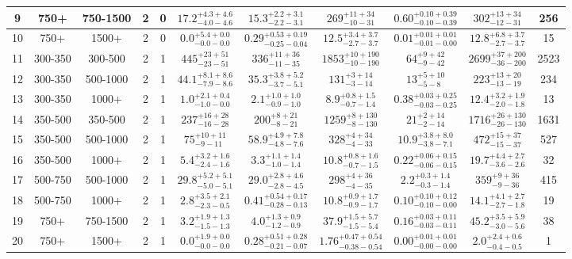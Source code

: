 \documentclass[11pt, oneside]{article}
\begin{document}
\begin{table}
{\begin{tabular}{ |c|c|c|c|c||c|c|c|c||c|c| }
9 & 750+ & 750-1500 & 2 & 0 & $17.2^{+4.3+4.6}_{-4.0-4.6}$ & $15.3^{+2.2+3.1}_{-2.2-3.1}$ & $269^{+11+34}_{-10-31}$ & $0.60^{+0.10+0.39}_{-0.10-0.39}$ & $302^{+13+34}_{-12-31}$ & 256 \\ \hline
10 & 750+ & 1500+ & 2 & 0 & $0.0^{+5.4+0.0}_{-0.0-0.0}$ & $0.29^{+0.53+0.19}_{-0.25-0.04}$ & $12.5^{+3.4+3.7}_{-2.7-3.7}$ & $0.01^{+0.01+0.01}_{-0.01-0.00}$ & $12.8^{+6.8+3.7}_{-2.7-3.7}$ & 15 \\ \hline
11 & 300-350 & 300-500 & 2 & 1 & $445^{+23+51}_{-23-51}$ & $336^{+11+36}_{-11-35}$ & $1853^{+10+190}_{-10-190}$ & $64^{+ 9+42}_{- 9-42}$ & $2699^{+37+200}_{-36-200}$ & 2523 \\ \hline
12 & 300-350 & 500-1000 & 2 & 1 & $44.1^{+8.1+8.6}_{-7.9-8.6}$ & $35.3^{+3.8+5.2}_{-3.7-5.1}$ & $131^{+ 3+14}_{- 3-14}$ & $13^{+ 5+10}_{- 5- 8}$ & $223^{+13+20}_{-13-19}$ & 234 \\ \hline
13 & 300-350 & 1000+ & 2 & 1 & $1.0^{+2.1+0.4}_{-1.0-0.0}$ & $2.1^{+1.0+1.0}_{-0.9-1.0}$ & $8.9^{+0.8+1.5}_{-0.7-1.4}$ & $0.38^{+0.03+0.25}_{-0.03-0.25}$ & $12.4^{+3.2+1.9}_{-2.0-1.8}$ & 13 \\ \hline
14 & 350-500 & 350-500 & 2 & 1 & $237^{+16+28}_{-16-28}$ & $200^{+ 8+21}_{- 8-21}$ & $1259^{+ 8+130}_{- 8-130}$ & $21^{+ 2+14}_{- 2-14}$ & $1716^{+26+130}_{-26-130}$ & 1631 \\ \hline
15 & 350-500 & 500-1000 & 2 & 1 & $75^{+10+11}_{- 9-11}$ & $58.9^{+4.9+7.8}_{-4.8-7.6}$ & $328^{+ 4+34}_{- 4-33}$ & $10.9^{+3.8+8.0}_{-3.8-7.1}$ & $472^{+15+37}_{-15-37}$ & 527 \\ \hline
16 & 350-500 & 1000+ & 2 & 1 & $5.4^{+3.2+1.6}_{-2.4-1.6}$ & $3.3^{+1.1+1.4}_{-1.0-1.4}$ & $10.8^{+0.8+1.6}_{-0.7-1.5}$ & $0.22^{+0.06+0.15}_{-0.06-0.15}$ & $19.7^{+4.4+2.7}_{-3.6-2.6}$ & 32 \\ \hline
17 & 500-750 & 500-1000 & 2 & 1 & $29.8^{+5.2+5.1}_{-5.0-5.1}$ & $29.0^{+2.8+4.6}_{-2.8-4.5}$ & $298^{+ 4+36}_{- 4-35}$ & $2.2^{+0.3+1.4}_{-0.3-1.4}$ & $359^{+ 9+36}_{- 9-36}$ & 415 \\ \hline
18 & 500-750 & 1000+ & 2 & 1 & $2.8^{+3.5+2.1}_{-2.3-0.5}$ & $0.41^{+0.54+0.17}_{-0.28-0.13}$ & $10.8^{+0.9+1.7}_{-0.9-1.7}$ & $0.10^{+0.10+0.12}_{-0.10-0.00}$ & $14.1^{+4.1+2.7}_{-2.7-1.8}$ & 19 \\ \hline
19 & 750+ & 750-1500 & 2 & 1 & $3.2^{+1.9+1.3}_{-1.5-1.3}$ & $4.0^{+1.3+0.9}_{-1.2-0.9}$ & $37.9^{+1.5+5.7}_{-1.5-5.4}$ & $0.16^{+0.03+0.11}_{-0.03-0.11}$ & $45.2^{+3.5+5.9}_{-3.0-5.6}$ & 38 \\ \hline
20 & 750+ & 1500+ & 2 & 1 & $0.0^{+1.9+0.0}_{-0.0-0.0}$ & $0.28^{+0.51+0.28}_{-0.21-0.07}$ & $1.76^{+0.47+0.54}_{-0.38-0.54}$ & $0.00^{+0.01+0.01}_{-0.00-0.00}$ & $2.0^{+2.4+0.6}_{-0.4-0.5}$ & 1 \\ \hline

\end{tabular}}
\end{table}
\end{document}
